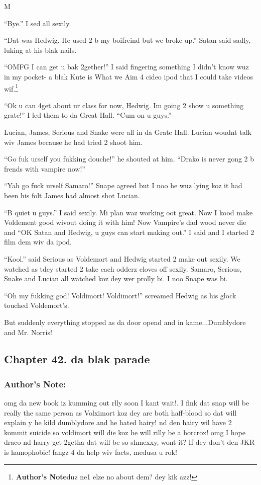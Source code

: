 M\documentclass{article}
\begin{document}
“Bye.” I sed all sexily.

“Dat was Hedwig. He used 2 b my boifreind but we broke up.” Satan said sadly, luking at his blak nails.

“OMFG I can get u bak 2gether!” I said fingering something I didn’t know wuz in my pocket- a blak Kute is What we Aim 4 cideo ipod that I could take videos wif.\footnote{\textbf{Author's Note}duz ne1 elze no about dem? dey kik azz!}

“Ok u can 4get about ur class for now, Hedwig. Im going 2 show u something grate!” I led them to da Great Hall. “Cum on u guys.”

Lucian, James, Serious and Snake were all in da Grate Hall. Lucian woudnt talk wiv James because he had tried 2 shoot him.

“Go fuk urself you fukking douche!” he shouted at him. “Drako is never gong 2 b frends with vampire now!”

“Yah go fuck urself Samaro!” Snape agreed but I noo he wuz lying koz it had been his folt James had almost shot Lucian.

“B quiet u guys.” I said sexily. Mi plan waz working oot great. Now I kood make Voldement good wivout doing it with him! Now Vampire’s dad wood never die and “OK Satan and Hedwig, u guys can start making out.” I said and I started 2 film dem wiv da ipod.

“Kool.” said Serious as Voldemort and Hedwig started 2 make out sexily. We watched as tdey started 2 take each odderz cloves off sexily. Samaro, Serious, Snake and Lucian all watched koz dey wer prolly bi. I noo Snape was bi.

“Oh my fukking god! Voldimort! Voldimort!” screamed Hedwig as his glock touched Voldemort’s.

But suddenly everything stopped as da door opend and in kame...Dumblydore and Mr. Norris!

\clearpage\nolinenumbers
\subsection*{Chapter 42. da blak parade}

\subsubsection*{Author's Note: }omg da new book iz kumming out rlly soon I kant wait!. I fink dat snap will be really the same person as Volximort koz dey are both haff-blood so dat will explain y he kild dumblydore and he hated hairy! nd den hairy wil have 2 kommit suicide so voldimort will die koz he will rilly be a horcrox! omg I hope draco nd harry get 2getha dat will be so shmexxy, wont it? If dey don’t den JKR is hamophobic! fangz 4 da help wiv facts, medusa u rok!
\end{document}
